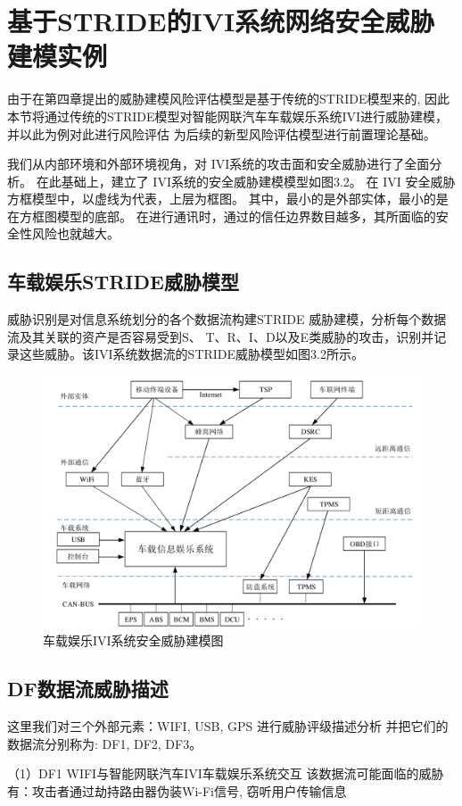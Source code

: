 \section{基于STRIDE的IVI系统网络安全威胁建模实例}
由于在第四章提出的威胁建模风险评估模型是基于传统的STRIDE模型来的, 因此本节将通过传统的STRIDE模型对智能网联汽车车载娱乐系统IVI进行威胁建模，并以此为例对此进行风险评估
为后续的新型风险评估模型进行前置理论基础。

我们从内部环境和外部环境视角，对 IVI系统的攻击面和安全威胁进行了全面分析。
在此基础上，建立了 IVI系统的安全威胁建模模型如图3.2。
在 IVI 安全威胁方框模型中，以虚线为代表，上层为框图。
其中，最小的是外部实体，最小的是在方框图模型的底部。
在进行通讯时，通过的信任边界数目越多，其所面临的安全性风险也就越大。

\subsection{车载娱乐STRIDE威胁模型}
威胁识别是对信息系统划分的各个数据流构建STRIDE
威胁建模，分析每个数据流及其关联的资产是否容易受到S、 T、R、I、D以及E类威胁的攻击，识别并记录这些威胁。该IVI系统数据流的STRIDE威胁模型如图3.2所示。
\begin{figure}
  \centering
  \includegraphics[scale=0.6]{resources/img/i33.png}
  \caption{车载娱乐IVI系统安全威胁建模图}
\end{figure}
\subsection{DF数据流威胁描述}
这里我们对三个外部元素：WIFI, USB, GPS 进行威胁评级描述分析
并把它们的数据流分别称为: DF1, DF2, DF3。

（1）DF1 WIFI与智能网联汽车IVI车载娱乐系统交互
该数据流可能面临的威胁有：攻击者通过劫持路由器伪装Wi-Fi信号, 窃听用户传输信息\cite{berghel2005wifi}

